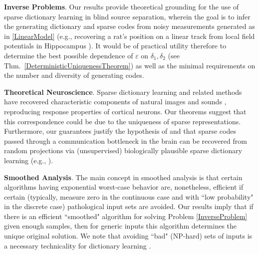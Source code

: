 \documentclass[journal, twocolumn]{IEEEtran}
\begin{document}
\textbf{Inverse Problems}.  
Our results provide theoretical grounding for the use of sparse dictionary learning in blind source separation, wherein the goal is to infer the generating dictionary and sparse codes from noisy measurements generated as in \eqref{LinearModel} (e.g., recovering a rat's position on a linear track from local field potentials in Hippocampus \cite{Agarwal14}). It would be of practical utility therefore to determine the best possible dependence of $\varepsilon$ on $\delta_1, \delta_2$ (see Thm.~\ref{DeterministicUniquenessTheorem}) as well as the minimal requirements on the number and diversity of generating codes. %

\textbf{Theoretical Neuroscience}.
Sparse dictionary learning and related methods have recovered characteristic components of natural images \cite{Olshausen96, hurri1996image, bell1997independent, van1998independent} and sounds \cite{bellsejnowski1996, smithlewicki2006, Carlson12}, reproducing response properties of cortical neurons. Our theorems suggest that this correspondence could be due to the uniqueness of sparse representations. Furthermore, our guarantees justify the hypothesis of \cite{Coulter10} and \cite{Isely10} that sparse codes passed through a communication bottleneck in the brain can be recovered from random projections via (unsupervised) biologically plausible sparse dictionary learning (e.g., \cite{rozell2007neurally, hu2014hebbian}).   


\textbf{Smoothed Analysis}.
The main concept in smoothed analysis \cite{Spielman04} is that certain algorithms having exponential worst-case behavior are, nonetheless, efficient if certain (typically, measure zero in the continuous case and with ``low probability" in the discrete case) pathological input sets are avoided. Our results imply that if there is an efficient ``smoothed" algorithm for solving Problem \ref{InverseProblem} given enough samples, then for generic inputs this algorithm determines the unique original solution. We note that avoiding ``bad" (NP-hard) sets of inputs is a necessary technicality for dictionary learning \cite{Razaviyayn15, Tillmann15}.
\end{document}
